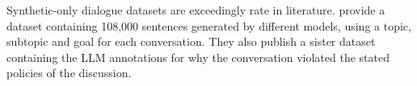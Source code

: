 Synthetic-only dialogue datasets are exceedingly rate in literature. \cite{lambert2024selfdirectedsyntheticdialoguesrevisions} provide a dataset containing  108,000 sentences generated by different models, using a topic, subtopic and goal for each conversation. They also publish a sister dataset containing the LLM annotations for why the conversation violated the stated policies of the discussion.


